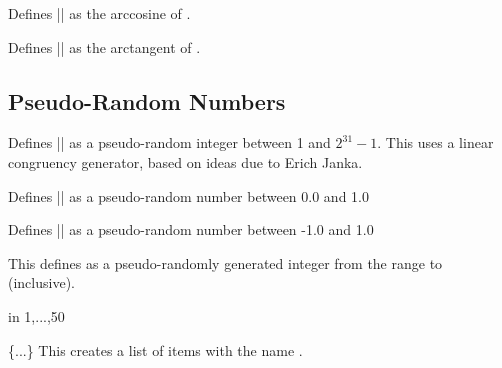 \begin{command}{}
	Defines |\pgfmathresult| as the arccosine of .
\end{command}

\begin{command}{}
 	Defines |\pgfmathresult| as the arctangent of .
\end{command}



\subsection{Pseudo-Random Numbers}

\label{pgfmath-random}


\begin{command}{\pgfmathgeneratepseudorandomnumber}
	Defines |\pgfmathresult| as a pseudo-random integer between 1 and 
	$2^{31}-1$. This uses a linear congruency generator, based on ideas
	due to Erich Janka.
\end{command}

\begin{command}{\pgfmathrnd}
	Defines |\pgfmathresult| as a pseudo-random number between 0.0 and 1.0
\end{command}

\begin{command}{\pgfmathrand}
	Defines |\pgfmathresult| as a pseudo-random number between -1.0 and 1.0
\end{command}

\begin{command}{\pgfmathrandominteger{}}
	This defines  as a pseudo-randomly generated integer from 
	the range  to  (inclusive).
	
\begin{codeexample}[]
\begin{pgfpicture}
   \foreach \x in {1,...,50}{
      \color{blue!40!white}
   }	  
\end{pgfpicture}
\end{codeexample}
\end{command}

\begin{command}{\pgfmathdeclarerandomlist{}\{...\}}
	This creates a list of items with the name .
\end{command}

